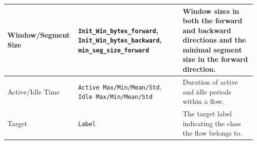 \begin{longtable}{|p{4cm}|p{6cm}|p{6cm}|}
    \hline
    Window/Segment Size                                                                                                                                                                                                                                                                                    &
    \texttt{Init\_Win\_bytes\_forward}, \texttt{Init\_Win\_bytes\_backward}, \texttt{min\_seg\_size\_forward}                                                                                                                                                                                              & Window sizes in both the forward and backward directions and the minimal segment size in the forward direction.                                                                                                                                                                  \\
    \hline
    Active/Idle Time                                                                                                                                                                                                                                                                                       &
    \texttt{Active Max/Min/Mean/Std}, \texttt{Idle Max/Min/Mean/Std}                                                                                                                                                                                                                                       & Duration of active and idle periods within a flow.                                                                                                                                                                                                                               \\
    \hline
    Target                                                                                                                                                                                                                                                                                                 &
    \texttt{Label}                                                                                                                                                                                                                                                                                         & The target label indicating the class the flow belongs to.
    \\
    \hline
\end{longtable}

